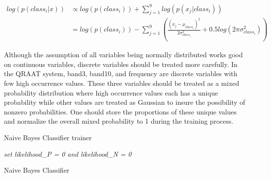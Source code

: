 \documentclass[twoside]{article}
\begin{document}
\begin{align*}
log(p(class_i | x)) &\propto log(p(class_i)) + \sum\limits_{j=1}^{9}  log(p(x_j|class_i)) \\
&= log(p(class_i)) - \sum\limits_{j=1}^{9}  ( \frac{(x_j - \mu_{class_i})^2}{2\sigma_{class_i}^2} + 0.5log(2\pi\sigma_{class_i}^2))
\end{align*}

Although the assumption of all variables being normally distributed works good on continuous variables, discrete variables should be treated more carefully. In the QRAAT system, band3, band10, and frequency are discrete variables with few high occurrence values. These three variables should be treated as a mixed probability distribution where high occurrence values each has a unique probability while other values are treated as Gaussian to insure the possibility of nonzero probabilities. One should store the proportions of these unique values and normalize the overall mixed probability to 1 during the training process. 

\IncMargin{1em}
\begin{algorithm}
\BlankLine
{}
\caption{Naive Bayes Classifier trainer}\label{NBCt}
\end{algorithm}\DecMargin{1em}

\IncMargin{1em}
\begin{algorithm}
\BlankLine
\emph{set likelihood\_P = 0 and likelihood\_N = 0}\;
\caption{Naive Bayes Classifier}\label{NBC}
\end{algorithm}\DecMargin{1em}
\end{document}
